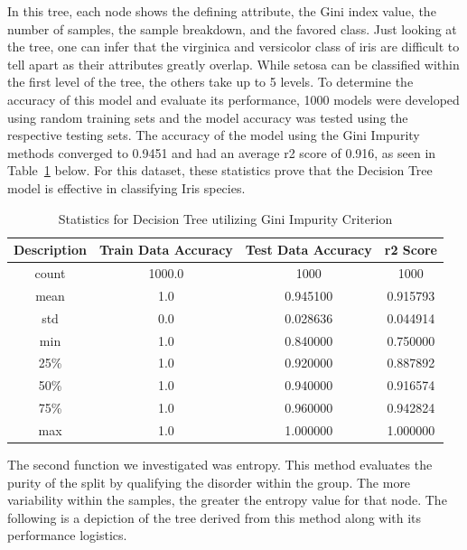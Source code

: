 \documentclass[journal]{IEEEtran}
\begin{document}
In this tree, each node shows the defining attribute, the Gini index value, the number of samples, the sample breakdown, and the favored class. Just looking at the tree, one can infer that the virginica and versicolor class of iris are difficult to tell apart as their attributes greatly overlap. While setosa can be classified within the first level of the tree, the others take up to 5 levels. To determine the accuracy of this model and evaluate its performance, 1000 models were developed using random training sets and the model accuracy was tested using the respective testing sets. The accuracy of the model using the Gini Impurity methods converged to 0.9451 and had an average r2 score of 0.916, as seen in Table~\ref{table:dtGI} below. For this dataset, these statistics prove that the Decision Tree model is effective in classifying Iris species. 

\begin{table}[h!]
\centering
\begin{tabular}{ c | c c c }
    Description & Train Data Accuracy & Test Data Accuracy & r2 Score \\ 
\hline
count & 1000.0    & 1000 & 1000  \\
mean  &    1.0    &    0.945100   &  0.915793 \\
std   &    0.0    &    0.028636   &  0.044914 \\
min   &    1.0    &    0.840000   &  0.750000 \\
25\%  &     1.0   &     0.920000  &   0.887892 \\
50\%  &     1.0   &     0.940000  &   0.916574 \\
75\%  &     1.0   &     0.960000  &   0.942824 \\
max   &   1.0     &   1.000000    & 1.000000
\end{tabular}
\caption{Statistics for Decision Tree utilizing Gini Impurity Criterion}
\label{table:dtGI}
\end{table}

\vspace{20px}
The second function we investigated was entropy. This method evaluates the purity of the split by qualifying the disorder within the group. The more variability within the samples, the greater the entropy value for that node. The following is a depiction of the tree derived from this method along with its performance logistics. 
\end{document}
